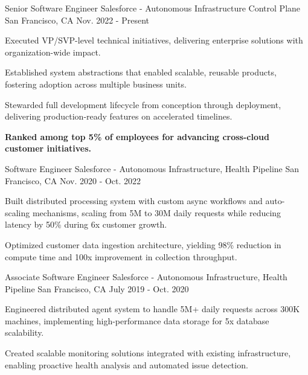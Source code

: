 \begin{cventries}
  \cventry
    {Senior Software Engineer}
    {Salesforce - Autonomous Infrastructure Control Plane}
    {San Francisco, CA}
    {Nov. 2022 - Present}
    {
      \begin{cvitems}
        \item {Executed VP/SVP-level technical initiatives, delivering enterprise solutions with organization-wide impact.}
        \item {Established system abstractions that enabled scalable, reusable products, fostering adoption across multiple business units.}
        \item {Stewarded full development lifecycle from conception through deployment, delivering production-ready features on accelerated timelines.}
        \item {\textbf{Ranked among top 5\% of employees for advancing cross-cloud customer initiatives.}}
      \end{cvitems}
    }

  \cventry
    {Software Engineer}
    {Salesforce - Autonomous Infrastructure, Health Pipeline}
    {San Francisco, CA}
    {Nov. 2020 - Oct. 2022}
    {
      \begin{cvitems}
        \item {Built distributed processing system with custom async workflows and auto-scaling mechanisms, scaling from 5M to 30M daily requests while reducing latency by 50\% during 6x customer growth.}
        \item {Optimized customer data ingestion architecture, yielding 98\% reduction in compute time and 100x improvement in collection throughput.}
      \end{cvitems}
    }

  \cventry
    {Associate Software Engineer}
    {Salesforce - Autonomous Infrastructure, Health Pipeline}
    {San Francisco, CA}
    {July 2019 - Oct. 2020}
    {
      \begin{cvitems}
        \item {Engineered distributed agent system to handle 5M+ daily requests across 300K machines, implementing high-performance data storage for 5x database scalability.}
        \item {Created scalable monitoring solutions integrated with existing infrastructure, enabling proactive health analysis and automated issue detection.}
      \end{cvitems}
    }


\end{cventries}
